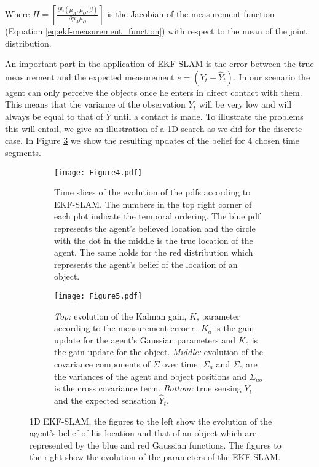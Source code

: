 \documentclass[review]{elsarticle}
\numberwithin{equation}{section}
\begin{document}
Where $H = \left[\frac{\partial h(\mu_A,\mu_O;\beta)}{\partial \mu_A\mu_O}\right]$ is the Jacobian of the measurement function (Equation \ref{eq:ekf-measurement_function})  
with respect to the mean of the joint distribution. 

An important part in the application of EKF-SLAM is the error between the true measurement and the expected measurement 
$e = (Y_t - \hat{Y}_t)$. In our scenario the agent can only perceive the objects once he enters in direct contact with them. 
This means that the variance of the observation $Y_t$ will be very low and will always be equal to that of $\hat{Y}$ until a contact is made. To illustrate the problems this will
entail, we give an illustration of a 1D search as we did for the discrete case. In Figure \ref{fig:EKF-SLAM} we show the resulting updates of the belief 
for 4 chosen time segments.

\begin{figure}
\centering
\begin{subfigure}[t]{0.4\textwidth}
\texttt{[image: Figure4.pdf]}

\caption{Time slices of the evolution of the pdfs according to EKF-SLAM. The numbers in the top right corner of each plot indicate the temporal ordering.
The blue pdf represents the agent's believed location and the circle with the dot in the middle is the true location of the agent. The same holds 
for the red distribution which represents the agent's belief of the location of an object.}

\label{fig:slam}
\end{subfigure}\qquad
\begin{subfigure}[t]{0.5\textwidth}
\texttt{[image: Figure5.pdf]}

\caption{\textit{Top:} evolution of the Kalman gain, $K$, parameter according to the measurement error $e$. $K_a$ is the gain update for the 
agent's Gaussian parameters and $K_o$ is the gain update for the object. \textit{Middle:} evolution of the covariance components of 
$\Sigma$ over time. $\Sigma_a$ and $\Sigma_o$ are the variances of the agent and object positions and $\Sigma_{ao}$ is the cross covariance 
term. \textit{Bottom:} true sensing $Y_t$ and the expected sensation $\hat{Y}_t$.}

\label{fig:slam-para}
\end{subfigure}

\caption{1D EKF-SLAM, the figures to the left show the evolution of the agent's belief of his location and that of an 
object which are represented by the blue and red Gaussian functions. The figures to the right show the evolution of the parameters of the EKF-SLAM.}
\label{fig:EKF-SLAM}
\end{figure}
\end{document}
